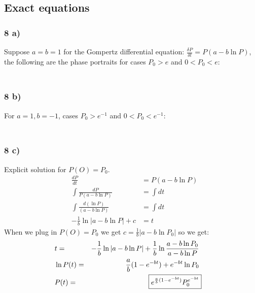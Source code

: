 \documentclass{article}
\begin{document}
\pagestyle{fancy}

\setcounter{section}{3}
\setcounter{subsection}{1}
\setcounter{subsubsection}{0}

\subsection{Exact equations}
\subsubsection{8 a)}
Suppose $ a = b = 1 $ for the Gompertz differential equation: $\frac{\delta P}{\delta t} = P(a - b\ln P)$, the following are the phase portraits for cases $ P_0 > e$ and $ 0 < P_0 < e $:
\begin{align*}
    & \\
    & \\
    & \\
\end{align*}
\subsubsection*{8 b)}
For $ a = 1, b = -1 $,  cases $ P_0 > e^{-1}$ and $ 0 < P_0 < e^{-1} $:
\begin{align*}
    & \\
    & \\
    & \\
\end{align*}
\subsubsection*{8 c)}
Explicit solution for $ P(O) = P_0 $.
\begin{align*}
    & \frac{dP}{dt} &= P(a - b\ln P) \\
    & \int \frac{dP}{P(a - b\ln P)} & = \int dt \\
    & \int \frac{d(\ln P)}{(a - b \ln P)} &= \int dt \\
    & - \frac{1}{b} \ln |a - b \ln P| + c &= t
\end{align*}
When we plug in $ P(O) = P_0 $ we get $ c = \frac{1}{b}|a - b \ln P_0|$ so we get:
\begin{align*}
    & t = & - \frac{1}{b} \ln |a - b \ln P| + \frac{1}{b} \ln \frac{a - b \ln P_0}{a - b \ln P} \\
    & \ln P(t) = & \frac{a}{b} (1 - e^{-bt}) + e^{-bt} \ln P_0 \\
    &P(t) = & \Aboxed{e^{\frac{a}{b} (1 - e^{-bt})} P_0^{e^{-bt}}} 
\end{align*}
\end{document}
